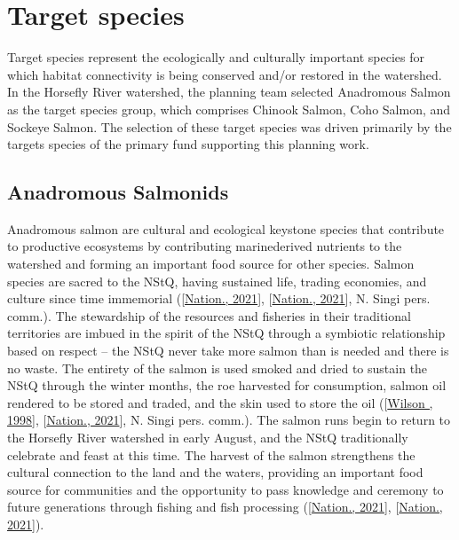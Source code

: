 \documentclass[letterpaper,10pt,english]{jupyterBook}
\let\sphinxpxdimen\pdfpxdimen\else\newdimen\sphinxpxdimen
\begin{document}
\begin{figure}[htbp]
\centering
\capstart

\noindent\sphinxincludegraphics[width=1000\sphinxpxdimen,height=400\sphinxpxdimen]{{figure2}.png}
\caption{}\label{\detokenize{Planning:fig2}}\end{figure}


\chapter{Target species}
\label{\detokenize{Planning:target-species}}
\sphinxAtStartPar
Target species represent the ecologically and culturally important species for which habitat connectivity is being conserved and/or restored in the watershed. In the Horsefly River watershed, the planning team selected Anadromous Salmon as the target species group, which comprises Chinook Salmon, Coho Salmon, and Sockeye Salmon. The selection of these target species was driven primarily by the targets species of the primary fund supporting this planning work.


\section{Anadromous Salmonids}
\label{\detokenize{Planning:anadromous-salmonids}}
\sphinxAtStartPar
Anadromous salmon are cultural and ecological keystone species that contribute to productive ecosystems by contributing marine\sphinxhyphen{}derived nutrients to the watershed and forming an important food source for other species. Salmon species are sacred to the NStQ, having sustained life, trading economies, and culture since time immemorial ({[}\hyperlink{cite.references:id28}{Nation., 2021}{]}, {[}\hyperlink{cite.references:id31}{Nation., 2021}{]}, N. Singi pers. comm.). The stewardship of the resources and fisheries in their traditional territories are imbued in the spirit of the NStQ through a symbiotic relationship based on respect – the NStQ never take more salmon than is needed and there is no waste. The entirety of the salmon is used \sphinxhyphen{} smoked and dried to sustain the NStQ through the winter months, the roe harvested for consumption, salmon oil rendered to be stored and traded, and the skin used to store the oil ({[}\hyperlink{cite.references:id29}{Wilson , 1998}{]}, {[}\hyperlink{cite.references:id31}{Nation., 2021}{]}, N. Singi pers. comm.). The salmon runs begin to return to the Horsefly River watershed in early August, and the NStQ traditionally celebrate and feast at this time. The harvest of the salmon strengthens the cultural connection to the land and the waters, providing an important food source for communities and the opportunity to pass knowledge and ceremony to future generations through fishing and fish processing ({[}\hyperlink{cite.references:id28}{Nation., 2021}{]}, {[}\hyperlink{cite.references:id31}{Nation., 2021}{]}).
\end{document}
